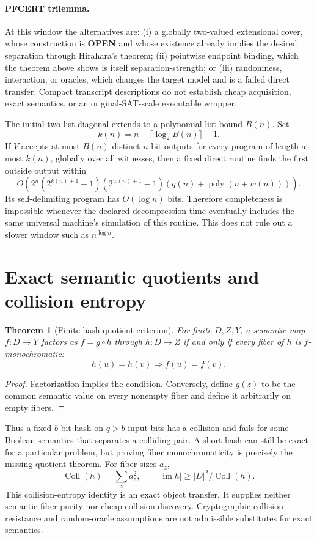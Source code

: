 \documentclass[11pt]{article}
\newtheorem{theorem}{Theorem}
\begin{document}
\paragraph{PFCERT trilemma.}
At this window the alternatives are: (i) a globally two-valued extensional
cover, whose construction is \textbf{OPEN} and whose existence already
implies the desired separation through Hirahara's theorem; (ii) pointwise
endpoint binding, which the theorem above shows is itself
separation-strength; or (iii) randomness, interaction, or oracles, which
changes the target model and is a failed direct transfer.  Compact transcript
descriptions do not establish cheap acquisition, exact semantics, or an
original-SAT-scale executable wrapper.

The initial two-list diagonal extends to a polynomial list bound \(B(n)\).
Set
\[
 k(n)=n-\lceil\log_2B(n)\rceil-1.
\]
If \(V\) accepts at most \(B(n)\) distinct \(n\)-bit outputs for every
program of length at most \(k(n)\), globally over all witnesses, then a fixed
direct routine finds the first outside output within
\[
 O\!\left(2^n(2^{k(n)+1}-1)(2^{w(n)+1}-1)
 (q(n)+\operatorname{poly}(n+w(n)))\right).
\]
Its self-delimiting program has \(O(\log n)\) bits. Therefore completeness
is impossible whenever the declared decompression time eventually includes
the same universal machine's simulation of this routine. This does not rule
out a slower window such as \(n^{\log n}\).

\section{Exact semantic quotients and collision entropy}
\begin{theorem}[Finite-hash quotient criterion]
For finite \(D,Z,Y\), a semantic map \(f:D\to Y\) factors as \(f=g\circ h\)
through \(h:D\to Z\) if and only if every fiber of \(h\) is
\(f\)-monochromatic:
\[
 h(u)=h(v)\Longrightarrow f(u)=f(v).
\]
\end{theorem}
\begin{proof}
Factorization implies the condition. Conversely, define \(g(z)\) to be the
common semantic value on every nonempty fiber and define it arbitrarily on
empty fibers.
\end{proof}
Thus a fixed \(b\)-bit hash on \(q>b\) input bits has a collision and fails
for some Boolean semantics that separates a colliding pair. A short hash can
still be exact for a particular problem, but proving fiber monochromaticity
is precisely the missing quotient theorem. For fiber sizes \(a_z\),
\[
 \operatorname{Coll}(h)=\sum_z a_z^2,\qquad
 |\operatorname{im}h|\ge |D|^2/\operatorname{Coll}(h).
\]
This collision-entropy identity is an exact object transfer. It supplies
neither semantic fiber purity nor cheap collision discovery. Cryptographic
collision resistance and random-oracle assumptions are not admissible
substitutes for exact semantics.
\end{document}
